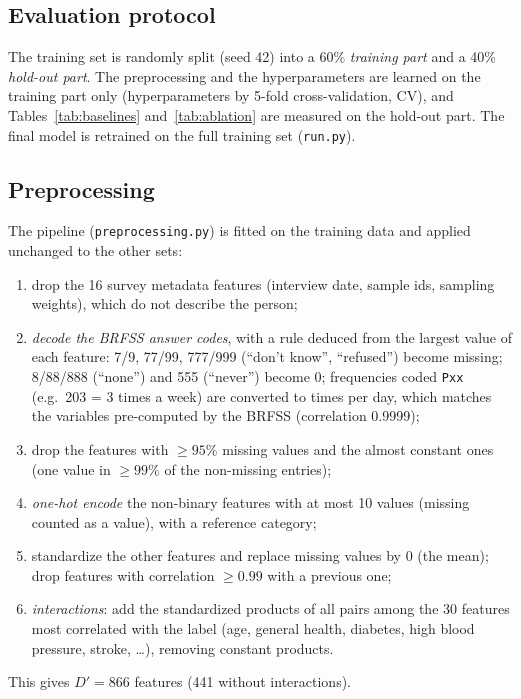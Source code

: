 \documentclass[10pt,conference,compsocconf]{IEEEtran}
\begin{document}
\subsection{Evaluation protocol}
The training set is randomly split (seed 42) into a 60\% \emph{training
part} and a 40\% \emph{hold-out part}. The preprocessing and the
hyperparameters are learned on the training part only (hyperparameters by
5-fold cross-validation, CV), and Tables~\ref{tab:baselines}
and~\ref{tab:ablation} are measured on the hold-out part. The final model
is retrained on the full training set (\texttt{run.py}).

\subsection{Preprocessing}
The pipeline (\texttt{preprocessing.py}) is fitted on the training data and
applied unchanged to the other sets:
\begin{enumerate}
\item drop the 16 survey metadata features (interview date, sample ids,
  sampling weights), which do not describe the person;
\item \emph{decode the BRFSS answer codes}, with a rule deduced from the
  largest value of each feature: 7/9, 77/99, 777/999 (``don't know'',
  ``refused'') become missing; 8/88/888 (``none'') and 555 (``never'')
  become 0; frequencies coded \texttt{Pxx} (e.g.\ 203 = 3 times a week)
  are converted to times per day, which matches the variables pre-computed
  by the BRFSS (correlation 0.9999);
\item drop the features with $\geq 95\%$ missing values and the almost
  constant ones (one value in $\geq 99\%$ of the non-missing entries);
\item \emph{one-hot encode} the non-binary features with at most 10 values
  (missing counted as a value), with a reference category;
\item standardize the other features and replace missing values by 0
  (the mean); drop features with correlation $\geq 0.99$ with a previous one;
\item \emph{interactions}: add the standardized products of all pairs among
  the 30 features most correlated with the label (age, general health,
  diabetes, high blood pressure, stroke, \dots), removing constant products.
\end{enumerate}
This gives $D'=866$ features (441 without interactions).
\end{document}
